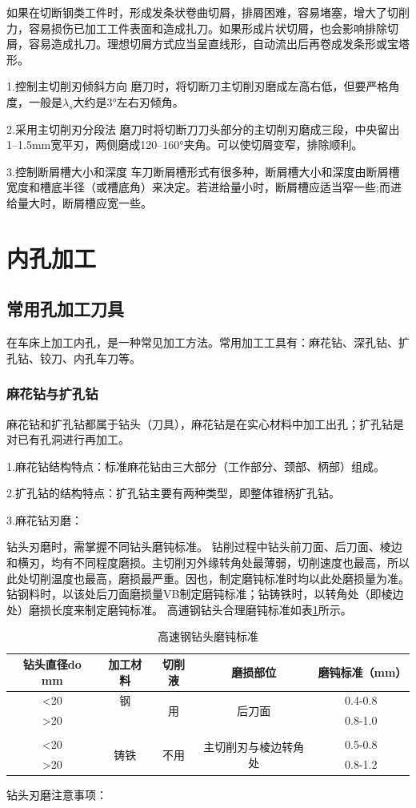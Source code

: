 \documentclass{ctexbook}
\begin{document}
如果在切断钢类工件时，形成发条状卷曲切屑，排屑困难，容易堵塞，增大了切削力，容易损伤已加工工件表面和造成扎刀。如果形成片状切屑，也会影响排除切屑，容易造成扎刀。理想切屑方式应当呈直线形，自动流出后再卷成发条形或宝塔形。

1.控制主切削刃倾斜方向 磨刀时，将切断刀主切削刃磨成左高右低，但要严格角度，一般是$\lambda_s$大约是3°左右刃倾角。

2.采用主切削刃分段法 磨刀时将切断刀刀头部分的主切削刃磨成三段，中央留出1--1.5mm宽平刃，两侧磨成120--160°夹角。可以使切屑变窄，排除顺利。

3.控制断屑槽大小和深度 车刀断屑槽形式有很多种，断屑槽大小和深度由断屑槽宽度和槽底半径（或槽底角）来决定。若进给量小时，断屑槽应适当窄一些;而进给量大时，断屑槽应宽一些。
\section{内孔加工}
\subsection{常用孔加工刀具}
在车床上加工内孔，是一种常见加工方法。常用加工工具有：麻花钻、深孔钻、扩孔钻、铰刀、内孔车刀等。
\subsubsection{麻花钻与扩孔钻}
麻花钻和扩孔钻都属于钻头（刀具），麻花钻是在实心材料中加工出孔；扩孔钻是对已有孔洞进行再加工。

1.麻花钻结构特点：标准麻花钻由三大部分（工作部分、颈部、柄部）组成。

2.扩孔钻的结构特点：扩孔钻主要有两种类型，即整体锥柄扩孔钻。

3.麻花钻刃磨：

钻头刃磨时，需掌握不同钻头磨钝标准。
钻削过程中钻头前刀面、后刀面、棱边和横刃，均有不同程度磨损。主切削刃外缘转角处最薄弱，切削速度也最高，所以此处切削温度也最高，磨损最严重。因也，制定磨钝标准时均以此处磨损量为准。钻钢料时，以该处后刀面磨损量VB制定磨钝标准；钻铸铁时，以转角处（即棱边处）磨损长度来制定磨钝标准。
高逋钢钻头合理磨钝标准如表\ref{tab:gaosugangzuantou}所示。
\begin{table}[htbp]
	\centering
	\caption{高速钢钻头磨钝标准}
	\begin{tabular}{c|c|c|c|c}
		\toprule
		钻头直径do mm & 加工材料  & 切削液   & 磨损部位  & 磨钝标准（mm） \\
		\midrule
		<20   & 钢     & \multirow{2}[4]{*}{用} & \multirow{2}[4]{*}{后刀面} & 0.4-0.8 \\
		\cmidrule{1-2}\cmidrule{5-5}    >20   &       &       &       & 0.8-1.0 \\
		\midrule
		&       &       &       &  \\
		\midrule
		<20   & \multirow{2}[4]{*}{铸铁} & \multirow{2}[4]{*}{不用} & \multirow{2}[4]{*}{主切削刃与棱边转角处} & 0.5-0.8 \\
		\cmidrule{1-1}\cmidrule{5-5}    >20   &       &       &       & 0.8-1.2 \\
		\bottomrule
	\end{tabular}%
	\label{tab:gaosugangzuantou}%
\end{table}%
钻头刃磨注意事项：
\end{document}
